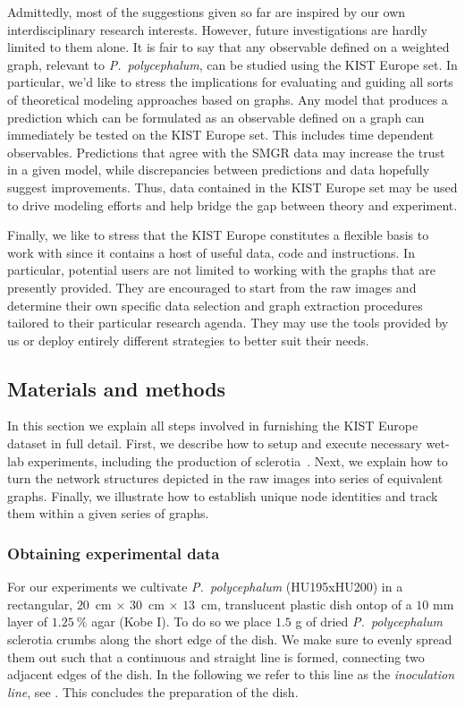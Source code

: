 		Admittedly, most of the suggestions given so far are inspired by our own interdisciplinary research interests. However, future investigations are hardly limited to them alone. It is fair to say that any observable defined on a weighted graph, relevant to \emph{P.~polycephalum}, can be studied using the KIST Europe set. In particular, we'd like to stress the implications for evaluating and guiding all sorts of theoretical modeling approaches based on graphs. Any model that produces a prediction which can be formulated as an observable defined on a graph can immediately be tested on the KIST Europe set. This includes time dependent observables. Predictions that agree with the SMGR data may increase the trust in a given model, while discrepancies between predictions and data hopefully suggest improvements. Thus, data contained in the KIST Europe set may be used to drive modeling efforts and help bridge the gap between theory and experiment.

		Finally, we like to stress that the KIST Europe constitutes a flexible basis to work with since it contains a host of useful data, code and instructions. In particular, potential users are not limited to working with the graphs that are presently provided. They are encouraged to start from the raw images and determine their own specific data selection and graph extraction procedures tailored to their particular research agenda. They may use the tools provided by us or deploy entirely different strategies to better suit their needs.

	\subsection{Materials and methods}

	    In this section we explain all steps involved in furnishing the KIST Europe dataset in full detail. First, we describe how to setup and execute necessary wet-lab experiments, including the production of sclerotia~\cite{lifecycle}. Next, we explain how to turn the network structures depicted in the raw images into series of equivalent graphs. Finally, we illustrate how to establish unique node identities and track them within a given series of graphs.

	    \subsubsection{Obtaining experimental data}

	      For our experiments we cultivate \emph{P.~polycephalum} (HU195xHU200) in a rectangular, $20$~cm $\times$ $30$~cm $\times$ $13$~cm, translucent plastic dish ontop of a $10$ mm layer of $1.25 \ \%$ agar (Kobe I). To do so we place $1.5$ g of dried \emph{P.~polycephalum} sclerotia crumbs along the short edge of the dish. We make sure to evenly spread them out such that a continuous and straight line is formed, connecting two adjacent edges of the dish. In the following we refer to this line as the \emph{inoculation line}, see . This concludes the preparation of the dish. 

